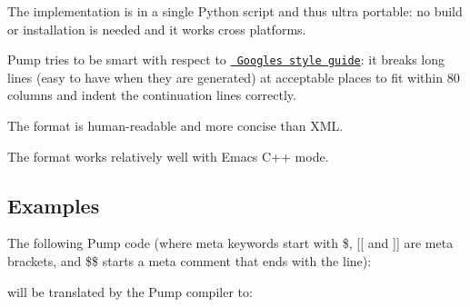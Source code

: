 \begin{DoxyItemize}
\item The implementation is in a single Python script and thus ultra portable\+: no build or installation is needed and it works cross platforms.
\item Pump tries to be smart with respect to \href{https://github.com/google/styleguide}{\texttt{ Google\textquotesingle{}s style guide}}\+: it breaks long lines (easy to have when they are generated) at acceptable places to fit within 80 columns and indent the continuation lines correctly.
\item The format is human-\/readable and more concise than X\+ML.
\item The format works relatively well with Emacs\textquotesingle{} C++ mode.
\end{DoxyItemize}

\subsection*{Examples}

The following Pump code (where meta keywords start with {\ttfamily \$}, {\ttfamily \mbox{[}\mbox{[}} and {\ttfamily \mbox{]}\mbox{]}} are meta brackets, and {\ttfamily \$\$} starts a meta comment that ends with the line)\+:


\begin{DoxyCode}{0}
\DoxyCodeLine{\$for i [[}
\DoxyCodeLine{\$if i == 0 [[}
\DoxyCodeLine{]] \$elif i <= 2 [[}
\DoxyCodeLine{]] \$else [[}
\DoxyCodeLine{]]}
\DoxyCodeLine{\};}
\DoxyCodeLine{}
\DoxyCodeLine{]]}
\end{DoxyCode}


will be translated by the Pump compiler to\+:


\begin{DoxyCode}{0}
\DoxyCodeLine{\};}
\DoxyCodeLine{}
\DoxyCodeLine{\};}
\DoxyCodeLine{}
\DoxyCodeLine{\};}
\DoxyCodeLine{}
\DoxyCodeLine{\};}
\end{DoxyCode}


